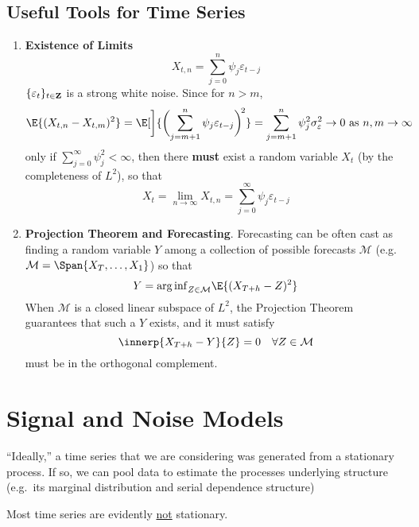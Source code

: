 \subsection{Useful Tools for Time Series}
\begin{enumerate}[(1)]
    \item \textbf{Existence of Limits}
          \[ X_{t,n}=\sum_{j=0}^{n} \psi_j \varepsilon_{t-j}
          \]
          $ \{\varepsilon_t\}_{t\in\mathbf{Z}} $ is a strong white noise.
          Since for $ n>m $,
          \[ \E{(X_{t,n}-X_{t,m})^2}
              =\E[\bigg]{\biggl(\sum_{j=m+1}^{n} \psi_j \varepsilon_{t-j}\biggr)^{\!2}}
              =\sum_{j=m+1}^{n} \psi_j^2\sigma_{\varepsilon}^2\to 0\text{ as }
              n,m\to \infty \]
          only if $ \sum_{j=0}^{\infty} \psi_j^2<\infty $, then there \textbf{must}
          exist a random variable $ X_t $ (by the completeness of $ L^2 $), so that
          \[ X_t=\lim\limits_{{n} \to {\infty}} X_{t,n}=\sum_{j=0}^{\infty}
              \psi_j \varepsilon_{t-j} \]
    \item \textbf{Projection Theorem and Forecasting}.
          Forecasting can be often cast as finding a random variable $ Y $ among
          a collection of possible forecasts $ \mathcal{M} $ (e.g.
          $ \mathcal{M}=\Span{X_T,\ldots,X_1} $) so that
          \[ Y={\arg\inf}_{Z\in\mathcal{M}}\E{(X_{T+h}-Z)^2} \]
          When $ \mathcal{M} $ is a closed linear subspace of $ L^2 $,
          the Projection Theorem guarantees that such a $ Y $ exists,
          and it must satisfy
          \[ \innerp{X_{T+h}-Y}{Z}=0\quad\forall Z\in\mathcal{M} \]
          must be in the orthogonal complement.
\end{enumerate}

\section{Signal and Noise Models}
``Ideally,'' a time series that we are considering
was generated from a stationary process. If so,
we can pool data to estimate the processes underlying structure
(e.g.\ its marginal distribution and serial dependence structure)

Most time series are evidently \underline{not} stationary.

